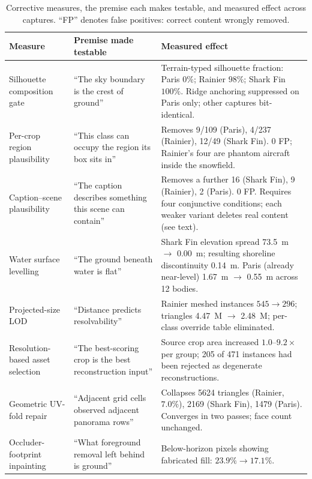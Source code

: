 \begin{table}[t]
\centering
\small
\caption{Corrective measures, the premise each makes testable, and measured effect
across captures. ``FP'' denotes false positives: correct content wrongly removed.}
\label{tab:fixes}
\begin{tabular}{@{}p{3.3cm}p{4.5cm}p{6.2cm}@{}}
\toprule
\textbf{Measure} & \textbf{Premise made testable} & \textbf{Measured effect} \\
\midrule
Silhouette composition gate &
``The sky boundary is the crest of ground'' &
Terrain-typed silhouette fraction: Paris $0\%$; Rainier $98\%$;
Shark Fin $100\%$. Ridge anchoring suppressed on Paris only; other captures
bit-identical. \\
\addlinespace
Per-crop region plausibility &
``This class can occupy the region its box sits in'' &
Removes 9/109 (Paris), 4/237 (Rainier), 12/49 (Shark Fin). 0 FP;
Rainier's four are phantom aircraft inside the snowfield. \\
\addlinespace
Caption--scene plausibility &
``The caption describes something this scene can contain'' &
Removes a further 16 (Shark Fin), 9 (Rainier), 2 (Paris). 0 FP.
Requires four conjunctive conditions; each weaker variant deletes real content
(see text). \\
\addlinespace
Water surface levelling &
``The ground beneath water is flat'' &
Shark Fin elevation spread \SI{73.5}{\meter} $\rightarrow$ \SI{0.00}{\meter};
resulting shoreline discontinuity \SI{0.14}{\meter}. Paris (already near-level)
\SI{1.67}{\meter} $\rightarrow$ \SI{0.55}{\meter} across 12 bodies. \\
\addlinespace
Projected-size LOD &
``Distance predicts resolvability'' &
Rainier meshed instances $545 \rightarrow 296$; triangles
\SI{4.47}{M} $\rightarrow$ \SI{2.48}{M}; per-class override table eliminated. \\
\addlinespace
Resolution-based asset selection &
``The best-scoring crop is the best reconstruction input'' &
Source crop area increased $1.0$--$9.2\times$ per group; \num{205} of \num{471}
instances had been rejected as degenerate reconstructions. \\
\addlinespace
Geometric UV-fold repair &
``Adjacent grid cells observed adjacent panorama rows'' &
Collapses \num{5624} triangles (Rainier, $7.0\%$), \num{2169} (Shark Fin),
\num{1479} (Paris). Converges in two passes; face count unchanged. \\
\addlinespace
Occluder-footprint inpainting &
``What foreground removal left behind is ground'' &
Below-horizon pixels showing fabricated fill: $23.9\% \rightarrow 17.1\%$. \\
\bottomrule
\end{tabular}
\end{table}

